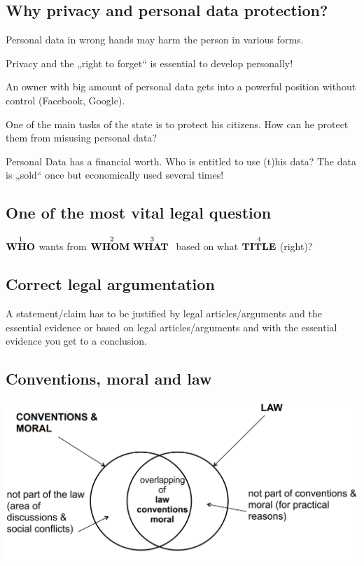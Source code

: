 \subsection{Why privacy and personal data protection?}
\begin{compactitem}
	\item Personal data in wrong hands may harm the person in various forms.
	\item Privacy and the „right to forget“ is essential to develop personally!
	\item An owner with big amount of personal data gets into a powerful position without control (Facebook, Google).
	\item One of the main tasks of the state is to protect his citizens. How can he protect them from misusing personal data?
	\item Personal Data has a financial worth. Who is entitled to use (t)his data? The data is „sold“ once but economically used several times!
\end{compactitem}

\subsection{One of the most vital legal question}
$\overset{1}{\text{\textbf{WHO}}}$ wants from $ \overset{2}{\text{\textbf{WHOM} }} \overset{3}{\text{\textbf{WHAT} }}$ based on what $\overset{4}{\text{\textbf{TITLE}}}$ (right)?

\subsection{Correct legal argumentation}
A statement/claim has to be justified by legal articles/arguments and the essential evidence or based on legal articles/arguments and with the essential evidence you get to a conclusion.

\subsection{Conventions, moral and law}
\includegraphics[width=1\linewidth]{images/conventions_moral_and_law}

